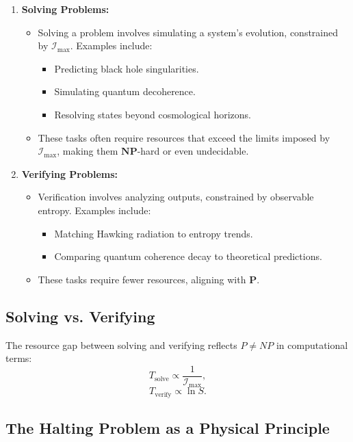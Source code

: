 \documentclass[12pt]{article}
\begin{document}
\begin{enumerate}
    \item \textbf{Solving Problems:}
    \begin{itemize}
        \item Solving a problem involves simulating a system’s evolution, constrained by $\mathcal{I}_{\text{max}}$. Examples include:
        \begin{itemize}
            \item Predicting black hole singularities.
            \item Simulating quantum decoherence.
            \item Resolving states beyond cosmological horizons.
        \end{itemize}
        \item These tasks often require resources that exceed the limits imposed by $\mathcal{I}_{\text{max}}$, making them $\mathbf{NP}$-hard or even undecidable.
    \end{itemize}
    \item \textbf{Verifying Problems:}
    \begin{itemize}
        \item Verification involves analyzing outputs, constrained by observable entropy. Examples include:
        \begin{itemize}
            \item Matching Hawking radiation to entropy trends.
            \item Comparing quantum coherence decay to theoretical predictions.
        \end{itemize}
        \item These tasks require fewer resources, aligning with $\mathbf{P}$.
    \end{itemize}
\end{enumerate}

\subsection{Solving vs. Verifying}

The resource gap between solving and verifying reflects $P \neq NP$ in computational terms:
\[
T_{\text{solve}} \propto \frac{1}{\mathcal{I}_{\text{max}}},
\]
\[
T_{\text{verify}} \propto \ln S.
\]

\subsection{The Halting Problem as a Physical Principle}
\end{document}
